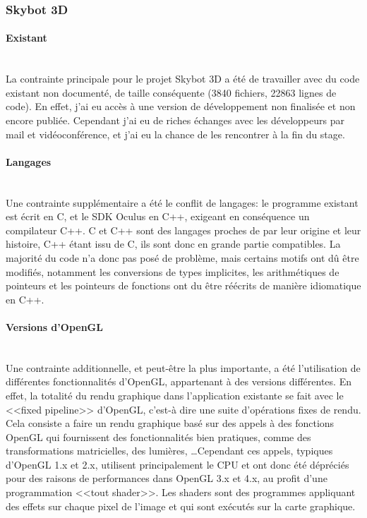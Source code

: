 \documentclass[a4paper,french,12pt]{article}
\begin{document}
	\subsubsection{Skybot 3D}
	    \paragraph{Existant} ~\\
	    
		La contrainte principale pour le projet Skybot 3D a été de travailler avec du code existant non documenté,
		de taille conséquente (3840 fichiers, 22863 lignes de code).
		En effet, j'ai eu accès à une version de développement non finalisée et non encore publiée. Cependant j'ai 
		eu de riches échanges avec les développeurs par mail et vidéoconférence, et j'ai eu la chance
		de les rencontrer à la fin du stage.
		
	    \paragraph{Langages} ~\\
	      
		Une contrainte supplémentaire a été le conflit de langages: le programme existant est écrit en C, et le
		SDK Oculus en C++, exigeant en conséquence un compilateur C++. 
		C et C++ sont des langages proches de par leur origine et leur histoire, C++ étant issu de C, 
		ils sont donc en grande partie compatibles. La majorité du code n'a donc pas posé de problème, 
		mais certains motifs ont dû être modifiés, notamment les conversions de types implicites,
		les arithmétiques de pointeurs et les pointeurs de fonctions ont du être réécrits de manière
		idiomatique en C++.
		
	    \paragraph{Versions d'OpenGL} ~\\
	    
		Une contrainte additionnelle, et peut-être la plus importante, a été l'utilisation de différentes 
		fonctionnalités d'OpenGL, appartenant à des versions différentes.
		En effet, la totalité du rendu graphique dans l'application existante se fait avec le <<fixed pipeline>> 
		d'OpenGL, c'est-à dire une suite d'opérations fixes de rendu. Cela consiste a faire un rendu graphique basé sur des
		appels à des fonctions OpenGL qui fournissent des fonctionnalités bien pratiques, comme des transformations
		matricielles, des lumières, \ldots Cependant ces appels, typiques d'OpenGL 1.x et 2.x, 
		utilisent principalement le CPU et ont donc
		été dépréciés pour des raisons de performances dans OpenGL 3.x et 4.x, au profit d'une programmation
		<<tout shader>>. Les shaders sont des programmes appliquant des effets sur chaque pixel de l'image et qui
		sont exécutés sur la carte graphique.
		
\end{document}
